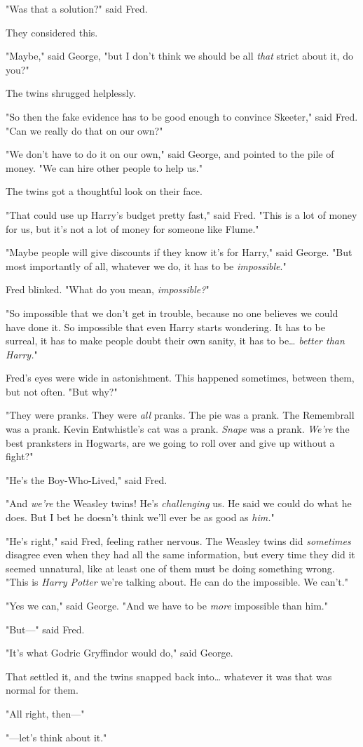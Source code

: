 "Was that a solution?" said Fred.

They considered this.

"Maybe," said George, "but I don't think we should be all \emph{that} strict 
about it, do you?"

The twins shrugged helplessly.

"So then the fake evidence has to be good enough to convince Skeeter," said 
Fred. "Can we really do that on our own?"

"We don't have to do it on our own," said George, and pointed to the pile of 
money. "We can hire other people to help us."

The twins got a thoughtful look on their face.

"That could use up Harry's budget pretty fast," said Fred. "This is a lot of 
money for us, but it's not a lot of money for someone like Flume."

"Maybe people will give discounts if they know it's for Harry," said George. 
"But most importantly of all, whatever we do, it has to be \emph{impossible}."

Fred blinked. "What do you mean, \emph{impossible?}"

"So impossible that we don't get in trouble, because no one believes we could 
have done it. So impossible that even Harry starts wondering. It has to be 
surreal, it has to make people doubt their own sanity, it has to be{\ldots} 
\emph{better than Harry.}"

Fred's eyes were wide in astonishment. This happened sometimes, between them, 
but not often. "But why?"

"They were pranks. They were \emph{all} pranks. The pie was a prank. The 
Remembrall was a prank. Kevin Entwhistle's cat was a prank. \emph{Snape} was a 
prank. \emph{We're} the best pranksters in Hogwarts, are we going to roll over 
and give up without a fight?"

"He's the Boy-Who-Lived," said Fred.

"And \emph{we're} the Weasley twins! He's \emph{challenging} us. He said we 
could do what he does. But I bet he doesn't think we'll ever be as good as 
\emph{him.}"

"He's right," said Fred, feeling rather nervous. The Weasley twins did 
\emph{sometimes} disagree even when they had all the same information, but 
every time they did it seemed unnatural, like at least one of them must be 
doing something wrong. "This is \emph{Harry Potter} we're talking about. He can 
do the impossible. We can't."

"Yes we can," said George. "And we have to be \emph{more} impossible than him."

"But---" said Fred.

"It's what Godric Gryffindor would do," said George.

That settled it, and the twins snapped back into{\ldots} whatever it was that 
was normal for them.

"All right, then---"

"---let's think about it."